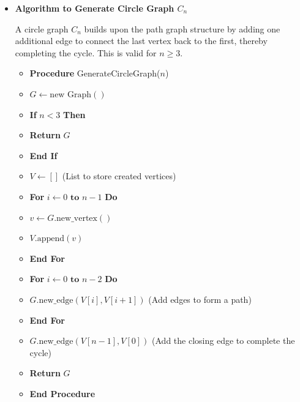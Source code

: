 \documentclass{article}
\begin{document}
\begin{itemize}
    \item \textbf{Algorithm to Generate Circle Graph $C_n$}
    
    A circle graph $C_n$ builds upon the path graph structure by adding one additional edge to connect the last vertex back to the first, thereby completing the cycle. This is valid for $n \ge 3$.
    
    \begin{itemize}
        \item \textbf{Procedure} GenerateCircleGraph($n$)
        \item \hspace{0.5cm} $G \gets \text{new Graph}()$
        \item \hspace{0.5cm} \textbf{If} $n < 3$ \textbf{Then}
        \item \hspace{1cm} \textbf{Return} $G$
        \item \hspace{0.5cm} \textbf{End If}
        \item \hspace{0.5cm} $V \gets []$ (List to store created vertices)
        \item \hspace{0.5cm} \textbf{For} $i \gets 0 \textbf{ to } n-1$ \textbf{Do}
        \item \hspace{1cm} $v \gets G.\text{new\_vertex}()$
        \item \hspace{1cm} $V.\text{append}(v)$
        \item \hspace{0.5cm} \textbf{End For}
        \item \hspace{0.5cm} \textbf{For} $i \gets 0 \textbf{ to } n-2$ \textbf{Do}
        \item \hspace{1cm} $G.\text{new\_edge}(V[i], V[i+1])$ (Add edges to form a path)
        \item \hspace{0.5cm} \textbf{End For}
        \item \hspace{0.5cm} $G.\text{new\_edge}(V[n-1], V[0])$ (Add the closing edge to complete the cycle)
        \item \hspace{0.5cm} \textbf{Return} $G$
        \item \textbf{End Procedure}
    \end{itemize}


\end{itemize}
\end{document}
